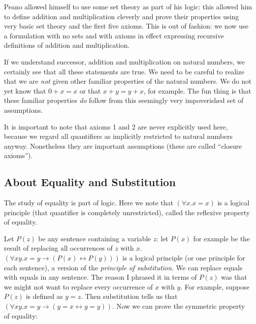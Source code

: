 \documentclass[12pt]{article}
\begin{document}
Peano allowed himself to use some set theory as part of his logic:
this allowed him to define addition and multiplication cleverly and
prove their properties using very basic set theory and the first five
axioms.  This is out of fashion: we now use a formulation with no sets
and with axioms in effect expressing recursive definitions of addition
and multiplication.

If we understand successor, addition and multiplication on natural
numbers, we certainly see that all these statements are true.  We need
to be careful to realize that we are {\em not\/} given other familiar
properties of the natural numbers.  We do not yet know that $0+x=x$ or
that $x+y=y+x$, for example.  The fun thing is that these familiar
properties {\em do\/} follow from this seemingly very impoverished set
of assumptions.

It is important to note that axioms 1 and 2 are never explicitly used
here, because we regard all quantifiers as implicitly restricted to
natural numbers anyway.  Nonetheless they are important assumptions
(these are called ``closure axioms'').

\subsection{About Equality and Substitution}

The study of equality is part of logic.  Here we note that $(\forall
x.x=x)$ is a logical principle (that quantifier is completely
unrestricted), called the reflexive property of equality.

Let $P(z)$ be any sentence containing a variable $z$: let $P(x)$ for
example be the result of replacing all occurrences of $z$ with $x$.
$(\forall xy.x=y \rightarrow (P(x) \leftrightarrow P(y)))$ is a logical
principle (or one principle for each sentence), a version of the {\em
principle of substitution\/}.  We can replace equals with equals in
any sentence.  The reason I phrased it in terms of $P(z)$ was that we might not want to replace every occurrence of $x$ with $y$.  For example, suppose
$P(z)$ is defined as $y=z$.  Then substitution tells us that $(\forall xy.x=y \rightarrow (y=x \leftrightarrow y=y))$.  Now we can prove the symmetric property of equality:
\end{document}
